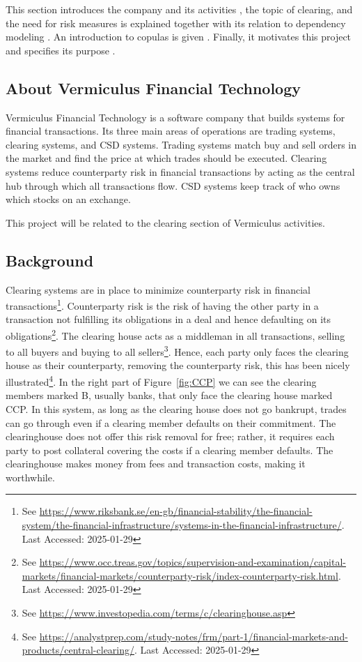 


This section introduces the company and its activities , the topic of clearing, and the need for risk measures is explained together with its relation to dependency modeling . An introduction to copulas is given . Finally, it motivates this project and specifies its purpose . 



\subsection{About Vermiculus Financial Technology} \label{AboutVFT}
Vermiculus Financial Technology is a software company that builds systems for financial transactions. Its three main areas of operations are trading systems, clearing systems, and \gls{CSD} systems. Trading systems match buy and sell orders in the market and find the price at which trades should be executed. Clearing systems reduce counterparty risk in financial transactions by acting as the central hub through which all transactions flow. \gls{CSD} systems keep track of who owns which stocks on an exchange.  

This project will be related to the clearing section of Vermiculus activities. 


\subsection{Background}\label{Background}
Clearing systems are in place to minimize counterparty risk in financial transactions\footnote{See \url{https://www.riksbank.se/en-gb/financial-stability/the-financial-system/the-financial-infrastructure/systems-in-the-financial-infrastructure/}. Last Accessed: 2025-01-29}. Counterparty risk is the risk of having the other party in a transaction not fulfilling its obligations in a deal and hence defaulting on its obligations\footnote{See \url{https://www.occ.treas.gov/topics/supervision-and-examination/capital-markets/financial-markets/counterparty-risk/index-counterparty-risk.html}. Last Accessed: 2025-01-29}. 
The clearing house acts as a middleman in all transactions, selling to all buyers and buying to all sellers\footnote{See \url{https://www.investopedia.com/terms/c/clearinghouse.asp}}. Hence, each party only faces the clearing house as their counterparty, removing the counterparty risk, this has been nicely illustrated\footnote{See \url{https://analystprep.com/study-notes/frm/part-1/financial-markets-and-products/central-clearing/}. Last Accessed: 2025-01-29}. In the right part of Figure~\ref{fig:CCP} we can see the clearing members marked B, usually banks, that only face the clearing house marked CCP. In this system, as long as the clearing house does not go bankrupt, trades can go through even if a clearing member defaults on their commitment. The clearinghouse does not offer this risk removal for free; rather, it requires each party to post collateral covering the costs if a clearing member defaults. The clearinghouse makes money from fees and transaction costs, making it worthwhile.

